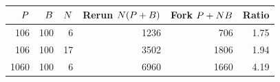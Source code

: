 \begin{table}[t]
\centering
\caption{}
\label{tab:forkcost}
\footnotesize
\begin{tabular}{@{}rrrrrr@{}}
\toprule
$P$ & $B$ & $N$ & Rerun $N(P+B)$ & Fork $P+NB$ & Ratio \\
\midrule
106  & 100 & 6  & 1236 & 706  & 1.75 \\
106  & 100 & 17 & 3502 & 1806 & 1.94 \\
1060 & 100 & 6  & 6960 & 1660 & 4.19 \\
\bottomrule
\end{tabular}
\end{table}
